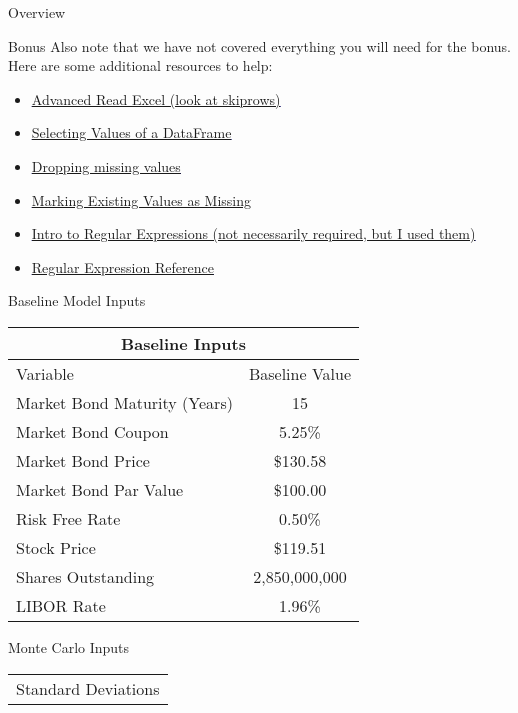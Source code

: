 \documentclass[]{article}
\begin{document}
\begin{section}{Overview}
\begin{subsection}{Bonus}
Also note that we have not covered everything you will need for the bonus. Here are some additional resources to help:
\begin{itemize}
\item \textcolor{blue}{\underline{\href{https://pandas.pydata.org/pandas-docs/stable/reference/api/pandas.read\_excel.html}{Advanced Read Excel (look at skiprows)}}}
\item \textcolor{blue}{\underline{\href{https://pandas.pydata.org/pandas-docs/stable/getting\_started/10min.html\#selection}{Selecting Values of a DataFrame}}}
\item \textcolor{blue}{\underline{\href{https://pandas.pydata.org/pandas-docs/stable/reference/api/pandas.DataFrame.dropna.html}{Dropping missing values}}}
\item \textcolor{blue}{\underline{\href{https://pandas.pydata.org/pandas-docs/stable/reference/api/pandas.DataFrame.fillna.html}{Marking Existing Values as Missing}}}
\item \textcolor{blue}{\underline{\href{https://scotch.io/tutorials/an-introduction-to-regex-in-python}{Intro to Regular Expressions (not necessarily required, but I used them)}}}
\item \textcolor{blue}{\underline{\href{https://docs.python.org/3/library/re.html}{Regular Expression Reference}}}
\end{itemize}

\end{subsection}
\begin{subsection}{Baseline Model Inputs}
\begin{center}
\begin{tabular}{l|c}
\multicolumn{2}{c}{Baseline Inputs}\\

\toprule
Variable & Baseline Value\\

\cmidrule(lr){1-2}
Market Bond Maturity (Years) & 15\\
Market Bond Coupon & 5.25\%\\
Market Bond Price & \$130.58\\
Market Bond Par Value & \$100.00\\
Risk Free Rate & 0.50\%\\
Stock Price & \$119.51\\
Shares Outstanding & 2,850,000,000\\
LIBOR Rate & 1.96\%\\

\bottomrule
\end{tabular}
\end{center}
\label{baseline-inputs}
\end{subsection}
\begin{subsection}{Monte Carlo Inputs}
\begin{center}
\begin{tabular}{l|c}
\multicolumn{2}{c}{Standard Deviations}\\


\end{tabular}
\end{center}
\end{subsection}
\end{section}
\end{document}
